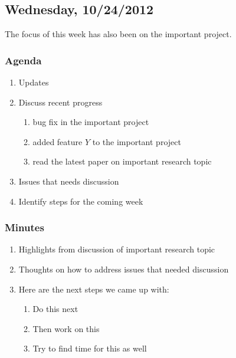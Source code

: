 \subsection{Wednesday, 10/24/2012}

The focus of this week has also been on the important project.

\subsubsection{Agenda}

\begin{enumerate}

    \item Updates

    \item Discuss recent progress

        \begin{enumerate}

            \item bug fix in the important project

            \item added feature $Y$ to the important project

            \item read the latest paper on important research topic

        \end{enumerate}

    \item Issues that needs discussion

    \item Identify steps for the coming week

\end{enumerate}

\subsubsection{Minutes}

\begin{enumerate}

    \item Highlights from discussion of important research topic

    \item Thoughts on how to address issues that needed discussion

    \item Here are the next steps we came up with:

        \begin{enumerate}

            \item Do this next

            \item Then work on this

            \item Try to find time for this as well

        \end{enumerate}

\end{enumerate}

